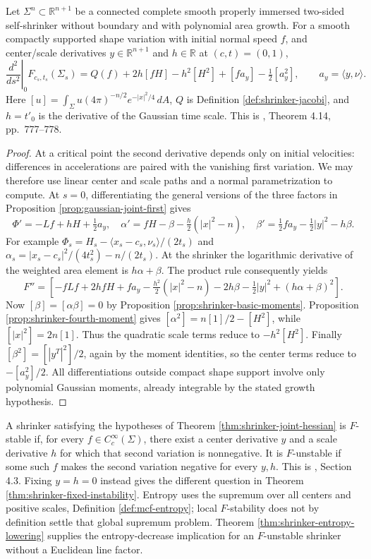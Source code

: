 \begin{theorem}\label{thm:shrinker-joint-hessian}
Let $\Sigma^n\subset\mathbb R^{n+1}$ be a connected complete smooth properly immersed two-sided self-shrinker without boundary and with polynomial area growth. For a smooth compactly supported shape variation with initial normal speed $f$, and center/scale derivatives $y\in\mathbb R^{n+1}$ and $h\in\mathbb R$ at $(c,t)=(0,1)$,
\[
 \left.\frac{d^2}{ds^2}\right|_0 F_{c_s,t_s}(\Sigma_s)
 =Q(f)+2h[fH]-h^2[H^2]+[f a_y]-\tfrac12[a_y^2],
 \qquad a_y=\langle y,\nu\rangle.
\]
Here $[u]=\int_\Sigma u(4\pi)^{-n/2}e^{-|x|^2/4}\,dA$, $Q$ is Definition \ref{def:shrinker-jacobi}, and $h=t'_0$ is the derivative of the Gaussian time scale. This is \cite{CM12}, Theorem 4.14, pp.~777--778.
\end{theorem}
\begin{proof}
At a critical point the second derivative depends only on initial velocities: differences in accelerations are paired with the vanishing first variation. We may therefore use linear center and scale paths and a normal parametrization to compute. At $s=0$, differentiating the general versions of the three factors in Proposition \ref{prop:gaussian-joint-first} gives
\[
 \Phi'=-Lf+hH+\tfrac12a_y,\quad
 \alpha'=fH-\beta-\tfrac h2(|x|^2-n),\quad
 \beta'=\tfrac12fa_y-\tfrac12|y|^2-h\beta.
\]
For example $\Phi_s=H_s-\langle x_s-c_s,\nu_s\rangle/(2t_s)$ and $\alpha_s=|x_s-c_s|^2/(4t_s^2)-n/(2t_s)$. At the shrinker the logarithmic derivative of the weighted area element is $h\alpha+\beta$. The product rule consequently yields
\[
 F''=\left[-fLf+2hfH+fa_y-\tfrac{h^2}{2}(|x|^2-n)
 -2h\beta-\tfrac12|y|^2+(h\alpha+\beta)^2\right].
\]
Now $[\beta]=[\alpha\beta]=0$ by Proposition \ref{prop:shrinker-basic-moments}. Proposition \ref{prop:shrinker-fourth-moment} gives $[\alpha^2]=n[1]/2-[H^2]$, while $[|x|^2]=2n[1]$. Thus the quadratic scale terms reduce to $-h^2[H^2]$. Finally $[\beta^2]=[|y^T|^2]/2$, again by the moment identities, so the center terms reduce to $-[a_y^2]/2$. All differentiations outside compact shape support involve only polynomial Gaussian moments, already integrable by the stated growth hypothesis.
\end{proof}

\begin{definition}\label{def:shrinker-f-stability}
A shrinker satisfying the hypotheses of Theorem \ref{thm:shrinker-joint-hessian} is $F$-stable if, for every $f\in C_c^\infty(\Sigma)$, there exist a center derivative $y$ and a scale derivative $h$ for which that second variation is nonnegative. It is $F$-unstable if some such $f$ makes the second variation negative for every $y,h$. This is \cite{CM12}, Section 4.3. Fixing $y=h=0$ instead gives the different question in Theorem \ref{thm:shrinker-fixed-instability}. Entropy uses the supremum over all centers and positive scales, Definition \ref{def:mcf-entropy}; local $F$-stability does not by definition settle that global supremum problem. Theorem \ref{thm:shrinker-entropy-lowering} supplies the entropy-decrease implication for an $F$-unstable shrinker without a Euclidean line factor.
\end{definition}

